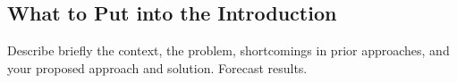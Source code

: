 \subsection{What to Put into the Introduction}
Describe briefly the context, the problem, shortcomings in prior
approaches, and your proposed approach and solution. Forecast results.


%
%



%
%


